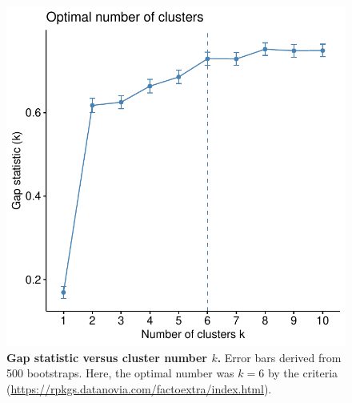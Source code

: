 \begin{figure}
    \centering
    \includegraphics[width=1.0\textwidth,page=1]{mainmatter/figures/chapter_04/plot_gene_set_enrichment.spline_fviz_nbclust_gap_stat.pdf}
    \caption[
    ]{
        \textbf{Gap statistic versus cluster number $k$.}
        Error bars derived from 500 bootstraps. 
        Here, the optimal number was $k=6$ by the   criteria (\url{https://rpkgs.datanovia.com/factoextra/index.html}).
    }
    \label{fig:multipants_dge_spline_fviz_nbclust_gap_stat}
\end{figure}

